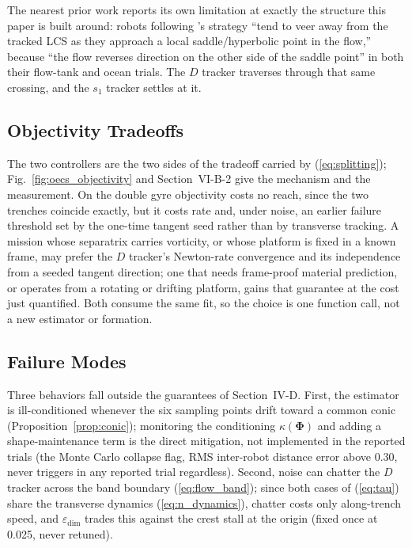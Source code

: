 \documentclass[lettersize,journal]{IEEEtran}
\begin{document}
The nearest prior work reports its own limitation at exactly the
structure this paper is built around: robots following \cite{9}'s
strategy ``tend to veer away from the tracked LCS as they approach a
local saddle/hyperbolic point in the flow,'' because ``the flow
reverses direction on the other side of the saddle point'' in both
their flow-tank and ocean trials. The $D$ tracker traverses through
that same crossing, and the $s_1$ tracker settles at it.

\subsection{Objectivity Tradeoffs}
\label{sec:objectivity_tradeoff}

The two controllers are the two sides of the tradeoff carried by
(\ref{eq:splitting}); Fig.~\ref{fig:oecs_objectivity} and
Section~\mbox{VI-B-2} give the mechanism and the measurement. On the
double gyre objectivity costs no reach, since the two trenches coincide
exactly, but it costs rate and, under noise, an earlier failure
threshold set by the one-time tangent seed rather than by transverse
tracking. A mission whose separatrix carries vorticity, or whose
platform is fixed in a known frame, may prefer the $D$ tracker's
Newton-rate convergence and its independence from a seeded tangent
direction; one that needs frame-proof material prediction, or operates
from a rotating or drifting platform, gains that guarantee at the cost
just quantified. Both consume the same fit, so the choice is one
function call, not a new estimator or formation.

\subsection{Failure Modes}
\label{sec:failure_modes}

Three behaviors fall outside the guarantees of Section~\mbox{IV-D}. First,
the estimator is ill-conditioned
whenever the six sampling points drift toward a common conic
(Proposition~\ref{prop:conic}); monitoring the conditioning
$\kappa(\boldsymbol{\Phi})$ and adding a shape-maintenance term is the
direct mitigation, not implemented in the reported trials (the Monte
Carlo collapse flag, RMS inter-robot distance error above 0.30, never
triggers in any reported trial regardless). Second, noise can chatter the
$D$ tracker across the band boundary (\ref{eq:flow_band}); since
both cases of (\ref{eq:tau}) share the transverse dynamics
(\ref{eq:n_dynamics}),
chatter costs only along-trench speed, and $\varepsilon_{\text{dim}}$
trades this against the crest stall at the origin
(fixed once at 0.025, never retuned).
\end{document}
